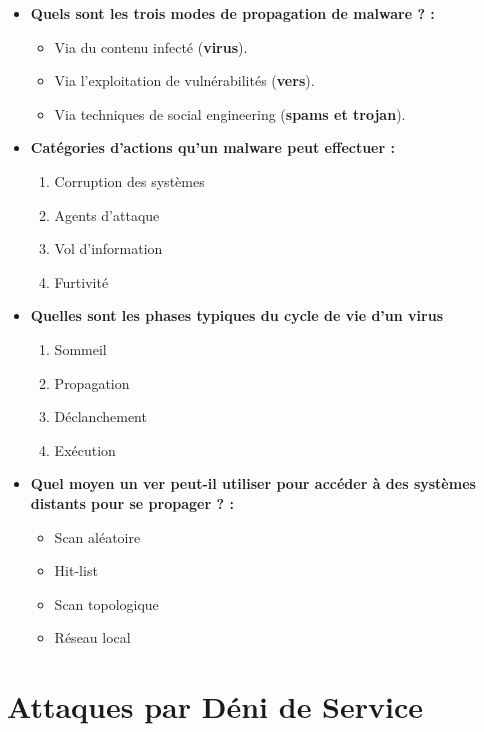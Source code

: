 \documentclass{report}
\begin{document}
			\begin{itemize}
				\item \textbf{Quels sont les trois modes de propagation de malware ? : }\\

					\begin{itemize}
						\item Via du contenu infecté (\textbf{virus}).
						\item Via l'exploitation de vulnérabilités (\textbf{vers}).
						\item Via techniques de social engineering (\textbf{spams et trojan}).
					\end{itemize}

				\item \textbf{Catégories d'actions qu'un malware peut effectuer : }

					\begin{enumerate}
						\item Corruption des systèmes
						\item Agents d'attaque
						\item Vol d'information
						\item Furtivité
					\end{enumerate}

				\item \textbf{Quelles sont les phases typiques du cycle de vie d'un virus}

					\begin{enumerate}
						\item Sommeil
						\item Propagation
						\item Déclanchement
						\item Exécution
					\end{enumerate}

				\item \textbf{Quel moyen un ver peut-il utiliser pour accéder à des systèmes distants pour se propager ? :}

					\begin{itemize}
						\item Scan aléatoire
						\item Hit-list
						\item Scan topologique
						\item Réseau local
					\end{itemize}
			\end{itemize}

\chapter{Attaques par Déni de Service}
	
\end{document}
